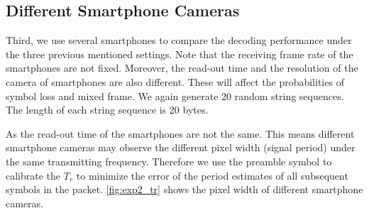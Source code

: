 
\subsection{Different Smartphone Cameras}
Third, we use several smartphones to compare the decoding performance under the three previous mentioned settings. 
Note that the receiving frame rate of the smartphones are not fixed. Moreover, the read-out time and the resolution of the camera of smartphones are also different. These will affect the probabilities of symbol loss and mixed frame. We again generate 20 random string sequences. The length of each string sequence is 20 bytes. 

As the read-out time of the smartphones are not the same. This means different smartphone cameras may observe the different pixel width (signal period) under the same transmitting frequency. Therefore we use the preamble symbol to calibrate the $T_r$ to minimize the error of the period estimates of all subsequent symbols in the packet. \autoref{fig:exp2_tr} shows the pixel width of different smartphone cameras. %

